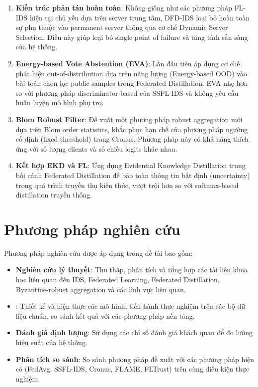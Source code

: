 \begin{enumerate}
    \item \textbf{Kiến trúc phân tán hoàn toàn}: Không giống như các phương pháp FL-IDS hiện tại chủ yếu dựa trên server trung tâm, DFD-IDS loại bỏ hoàn toàn sự phụ thuộc vào permanent server thông qua cơ chế Dynamic Server Selection. Điều này giúp loại bỏ single point of failure và tăng tính sẵn sàng của hệ thống.
    \item \textbf{Energy-based Vote Abstention (EVA)}: Lần đầu tiên áp dụng cơ chế phát hiện out-of-distribution dựa trên năng lượng (Energy-based OOD) vào bài toán chọn lọc public samples trong Federated Distillation. EVA nhẹ hơn so với phương pháp discriminator-based của SSFL-IDS và không yêu cầu huấn luyện mô hình phụ trợ.
    \item \textbf{Blom Robust Filter}: Đề xuất một phương pháp robust aggregation mới dựa trên Blom order statistics, khắc phục hạn chế của phương pháp ngưỡng cố định (fixed threshold) trong Cronus. Phương pháp này có khả năng thích ứng với số lượng clients và số chiều logits khác nhau.
    \item \textbf{Kết hợp EKD và FL}: Ứng dụng Evidential Knowledge Distillation trong bối cảnh Federated Distillation để bảo toàn thông tin bất định (uncertainty) trong quá trình truyền thụ kiến thức, vượt trội hơn so với softmax-based distillation truyền thống.
\end{enumerate}

\section{Phương pháp nghiên cứu}
\label{sec:methodology}

Phương pháp nghiên cứu được áp dụng trong đề tài bao gồm:
\begin{itemize}
    \item \textbf{Nghiên cứu lý thuyết}: Thu thập, phân tích và tổng hợp các tài liệu khoa học liên quan đến IDS, Federated Learning, Federated Distillation, Byzantine-robust aggregation và các lĩnh vực liên quan.
    \item {}: Thiết kế và hiện thực các mô hình, tiến hành thực nghiệm trên các bộ dữ liệu chuẩn, so sánh kết quả với các phương pháp nền tảng.
    \item \textbf{Đánh giá định lượng}: Sử dụng các chỉ số đánh giá khách quan để đo lường hiệu suất của hệ thống.
    \item \textbf{Phân tích so sánh}: So sánh phương pháp đề xuất với các phương pháp hiện có (FedAvg, SSFL-IDS, Cronus, FLAME, FLTrust) trên cùng điều kiện thực nghiệm.
\end{itemize}

